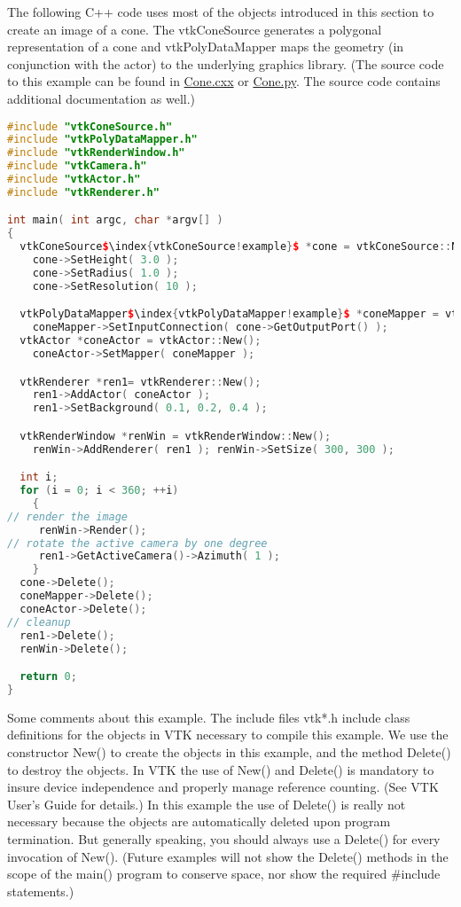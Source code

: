 \begin{description}[leftmargin=0cm,labelindent=0cm]

\item[Render a Cone.] The following C++ code uses most of the objects introduced in this section to create an image of a cone. The vtkConeSource generates a polygonal representation of a cone and vtkPolyDataMapper maps the geometry (in conjunction with the actor) to the underlying graphics library. (The source code to this example can be found in \href{https://lorensen.github.io/VTKExamples/site/Cxx/GeometricObjects/Cone/}{Cone.cxx} or \href{https://lorensen.github.io/VTKExamples/site/Python/GeometricObjects/Cone/}{Cone.py}. The source code contains additional documentation as well.)

\label{eg:render_cone}
\begin{lstlisting}[language=C++, caption={Cone.cxx}, escapechar=\$]
#include "vtkConeSource.h"
#include "vtkPolyDataMapper.h"
#include "vtkRenderWindow.h"
#include "vtkCamera.h"
#include "vtkActor.h"
#include "vtkRenderer.h"

int main( int argc, char *argv[] )
{
  vtkConeSource$\index{vtkConeSource!example}$ *cone = vtkConeSource::New();
    cone->SetHeight( 3.0 );
    cone->SetRadius( 1.0 );
    cone->SetResolution( 10 );

  vtkPolyDataMapper$\index{vtkPolyDataMapper!example}$ *coneMapper = vtkPolyDataMapper::New();
    coneMapper->SetInputConnection( cone->GetOutputPort() );
  vtkActor *coneActor = vtkActor::New();
    coneActor->SetMapper( coneMapper );

  vtkRenderer *ren1= vtkRenderer::New();
    ren1->AddActor( coneActor );
    ren1->SetBackground( 0.1, 0.2, 0.4 );

  vtkRenderWindow *renWin = vtkRenderWindow::New();
    renWin->AddRenderer( ren1 ); renWin->SetSize( 300, 300 );

  int i;
  for (i = 0; i < 360; ++i)
    {
// render the image
     renWin->Render();
// rotate the active camera by one degree
     ren1->GetActiveCamera()->Azimuth( 1 );
    }
  cone->Delete();
  coneMapper->Delete();
  coneActor->Delete();
// cleanup
  ren1->Delete();
  renWin->Delete();

  return 0;
}\end{lstlisting}

Some comments about this example. The include files vtk*.h include class definitions for the objects in VTK necessary to compile this example. We use the constructor New() to create the objects in this example, and the method Delete() to destroy the objects. In VTK the use of New() and Delete() is mandatory to insure device independence and properly manage reference counting. (See VTK User's Guide for details.) In this example the use of Delete() is really not necessary because the objects are automatically deleted upon program termination. But generally speaking, you should always use a Delete() for every invocation of New(). (Future examples will not show the Delete() methods in the scope of the main() program to conserve space, nor show the required \#include statements.)


\end{description}

